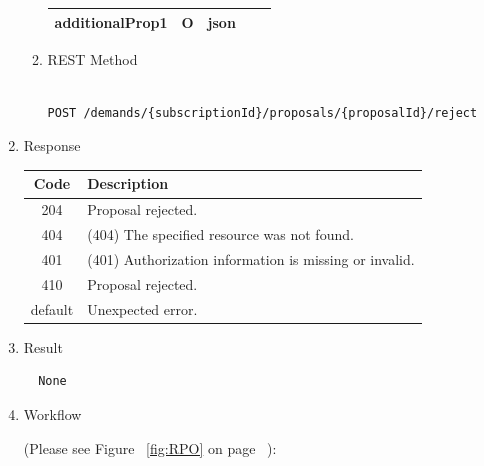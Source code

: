 \begin{enumerate}
\begin{enumerate}
\begin{center}
\begin{tabular}{|p{3cm}|l|p{3cm}|p{3cm}|p{4cm}|}
\hline

additionalProp1 	& O &	json			&		& 		\\

\hline

\end{tabular}
\end{center}

\item REST Method

\begin{tcolorbox}[boxrule=0pt, frame empty]
\begin{verbatim} 

POST /demands/{subscriptionId}/proposals/{proposalId}/reject

\end{verbatim}
\end{tcolorbox}

\end{enumerate}

\item Response

\begin{center}
\begin{tabular}{|c|l|} 
\hline
\rowcolor{lightgray}	Code 		& 	Description \\
\hline
204	 		&	Proposal rejected.  \\
\hline
404			&	(404) The specified resource was not found. \\
\hline
401			&	(401) Authorization information is missing or invalid. \\
\hline
410			&	Proposal rejected. \\
\hline
default		&	Unexpected error. \\
\hline
\end{tabular}
\end{center}


\item Result

\begin{tcolorbox}[boxrule=0pt, frame empty]
\begin{verbatim}
  None
\end{verbatim}
\end{tcolorbox}

\item Workflow

(Please see Figure ~\ref{fig:RPO} on page ~\pageref{fig:RPO}):


\end{enumerate}
